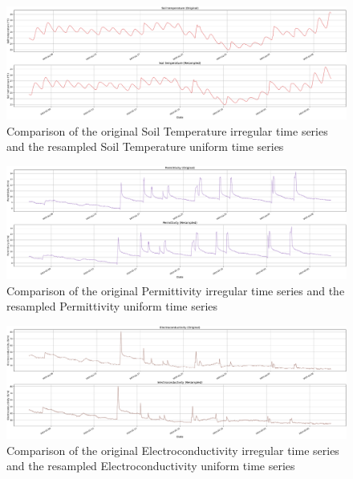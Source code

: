 \begin{figure}[htbp]
    \centering
    \includegraphics[width=15 cm]{5_ChapterDesign/figuras/5_Irregular/comparison_Soil_temperature.pdf}
    \caption{Comparison of the original Soil Temperature irregular time series and the resampled Soil Temperature uniform time series}
\end{figure}

\begin{figure}[htbp]
    \centering
    \includegraphics[width=15 cm]{5_ChapterDesign/figuras/5_Irregular/comparison_Permittivity.pdf}
    \caption{Comparison of the original Permittivity irregular time series and the resampled Permittivity uniform time series}
\end{figure}

\begin{figure}[htbp]
    \centering
    \includegraphics[width=15 cm]{5_ChapterDesign/figuras/5_Irregular/comparison_Electroconductivity.pdf}
    \caption{Comparison of the original Electroconductivity irregular time series and the resampled Electroconductivity uniform time series}
\end{figure}

